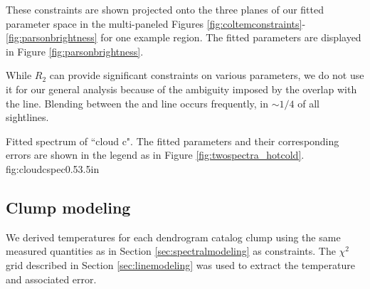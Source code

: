 These constraints are shown projected onto the three planes of our fitted
parameter space in the multi-paneled Figures
\ref{fig:coltemconstraints}-\ref{fig:parsonbrightness} for one example region.
The fitted parameters are displayed in Figure \ref{fig:parsonbrightness}.

While $R_2$ can provide significant constraints on various parameters, we do
not use it for our general analysis because of the ambiguity imposed by the
overlap with the \methanol \fourtwotwo line.  Blending between the \methanol
\fourtwotwo and \formaldehyde \threetwotwo line occurs frequently, in $\sim1/4$
of all sightlines.



{Fitted spectrum of ``cloud c".  The fitted parameters and their corresponding
errors are shown in the legend as in Figure \ref{fig:twospectra_hotcold}.}
{fig:cloudcspec}{0.5}{3.5in}



\subsection{Clump modeling}
\label{sec:dendromod}
We derived temperatures for each dendrogram catalog clump using the same
measured quantities as in Section \ref{sec:spectralmodeling} as constraints.
The $\chi^2$ grid described in Section \ref{sec:linemodeling} was used to
extract the temperature and associated error.

